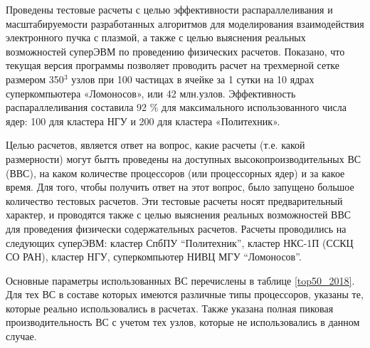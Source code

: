 Проведены тестовые расчеты с целью эффективности распараллеливания и масштабируемости разработанных алгоритмов для моделирования взаимодействия электронного пучка с плазмой, а также с целью выяснения реальных возможностей суперЭВМ по проведению физических расчетов. Показано, что текущая версия программы позволяет проводить расчет на трехмерной сетке размером 350$^3$ узлов при 100 частицах в ячейке за 1 сутки на 10 ядрах суперкомпьютера «Ломоносов», или 42 млн.узлов. Эффективность распараллеливания составила 92 \% для максимального использованного числа ядер: 100 для кластера НГУ и 200 для кластера «Политехник».  















Целью расчетов,  является ответ на вопрос, какие расчеты (т.е. какой размерности) могут бытть проведены на доступных высокопроизводительных  ВС (ВВС), на каком количестве процессоров (или процессорных ядер) и за какое время. 
Для того, чтобы получить ответ на этот вопрос, было запущено большое количество тестовых расчетов. Эти тестовые расчеты носят предварительный характер, и проводятся также с целью выяснения реальных возможностей ВВС для проведения физически содержательных расчетов. 	Расчеты проводились на следующих суперЭВМ: кластер СпбПУ “Политехник”, кластер НКС-1П (ССКЦ СО РАН), кластер НГУ,  суперкомпьютер НИВЦ МГУ “Ломоносов”. 

Основные параметры использованных ВС перечислены в таблице \ref{top50_2018}. Для тех ВС в составе которых имеются различные типы процессоров, указаны те, которые реально использовались в расчетах. Также указана полная пиковая производительность ВС с учетом тех узлов, которые не использовались в данном случае.

